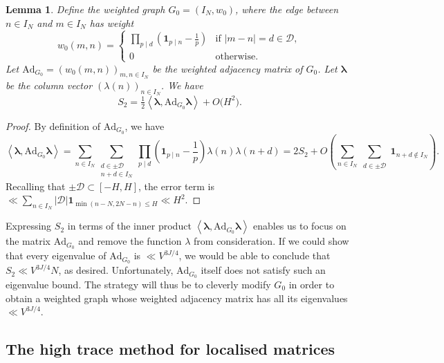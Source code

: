 \documentclass[11pt]{amsart}
\newtheorem{lemma}[theorem]{Lemma}
\theoremstyle{definition}
\renewcommand{\leq}{\leqslant}
\newcommand{\inner}[1]{\left\langle#1\right\rangle}
\newcommand{\abs}[1]{\left|#1\right|}
\newcommand{\ind}[1]{\mathbf{1}_{#1}}
\newcommand{\Ad}{\mathrm{Ad}}
\newcommand{\N}{I_N}
\newcommand{\D}{\mathcal{D}}
\newcommand{\curlyLexp}[1]{V^{#1}}
\newcommand{\graph}{G}
\newcommand{\repR}{J}
\begin{document}
\begin{lemma}
\label{lem:S2toadjacencyop}
Define the weighted graph ${\graph_0 = (\N, w_0)}$, where the edge between $n\in \N$ and $m\in \N$ has weight 
\begin{equation*}
w_0(m,n) = \begin{cases}
\prod_{p\mid d} \left(\ind{p\mid n} - \frac{1}{p}\right) &\text{if }|m-n| = d \in \D,\\
0 & \text{otherwise.}
\end{cases}
\end{equation*}
Let $\Ad_{\graph_0} = \left(w_0(m,n)\right)_{m,n\in \N}$ be the weighted adjacency matrix of $\graph_0$. Let $\boldsymbol{\lambda}$ be the column vector $\left(\lambda(n)\right)_{n\in \N}$. We have 
\begin{equation*}
S_2 = \tfrac12 \inner{\boldsymbol{\lambda}, \Ad_{\graph_0}\boldsymbol{\lambda}} + O\big(H^{2}\big).
\end{equation*}
\end{lemma}
\begin{proof}
By definition of $\Ad_{\graph_0}$, we have
\begin{equation*}
	\inner{\boldsymbol{\lambda}, \Ad_{\graph_0}\boldsymbol{\lambda}} = \sum_{n\in \N} \sum_{\substack{d\in \pm\D\\ n+ d\in \N}} \prod_{p\mid d} \left(\ind{p\mid n} - \frac{1}{p}\right) \lambda(n)\lambda(n+ d) = 2S_2 + O \left(\sum_{n\in \N} \sum_{\substack{d\in \pm\D}} \ind{n+d\not\in \N}\right).
\end{equation*}
Recalling that $\pm \D \subset [-H, H]$, the error term is $\ll \sum_{n\in \N} \abs{\D} \ind{\min(n-N, 2N-n) \leq H}  \ll H^2$.
\end{proof}

Expressing $S_2$ in terms of the inner product $\inner{\boldsymbol{\lambda}, \Ad_{\graph_0}\boldsymbol{\lambda}}$ enables us to focus on the matrix $\Ad_{\graph_0}$ and remove the function $\lambda$ from consideration. If we could show that every eigenvalue of $\Ad_{\graph_0}$ is $\ll \curlyLexp{3\repR/4}$, we would be able to conclude that $S_2 \ll \curlyLexp{3\repR/4} N$, as desired. Unfortunately, $\Ad_{\graph_0}$ itself does not satisfy such an eigenvalue bound. The strategy will thus be to cleverly modify $\graph_0$ in order to obtain a weighted graph whose weighted adjacency matrix has all its eigenvalues $\ll \curlyLexp{3\repR/4}$.



\subsection{The high trace method for localised matrices}
\end{document}
